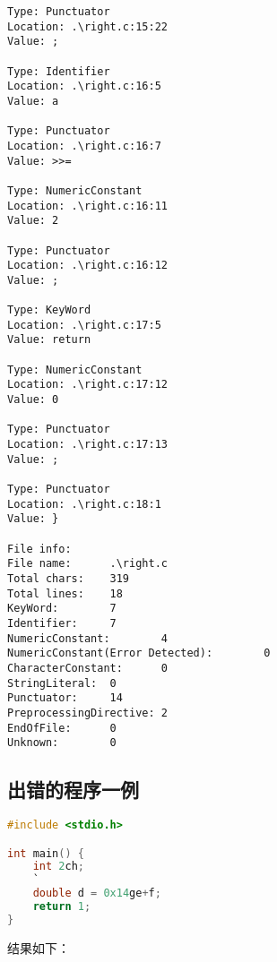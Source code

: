 \documentclass[blue,normal,cn]{elegantnote}
\begin{document}
\begin{lstlisting}
Type: Punctuator
Location: .\right.c:15:22
Value: ;

Type: Identifier
Location: .\right.c:16:5
Value: a

Type: Punctuator
Location: .\right.c:16:7
Value: >>=

Type: NumericConstant
Location: .\right.c:16:11
Value: 2

Type: Punctuator
Location: .\right.c:16:12
Value: ;

Type: KeyWord
Location: .\right.c:17:5
Value: return

Type: NumericConstant
Location: .\right.c:17:12
Value: 0

Type: Punctuator
Location: .\right.c:17:13
Value: ;

Type: Punctuator
Location: .\right.c:18:1
Value: }

File info:
File name:      .\right.c
Total chars:    319
Total lines:    18
KeyWord:        7
Identifier:     7
NumericConstant:        4
NumericConstant(Error Detected):        0
CharacterConstant:      0
StringLiteral:  0
Punctuator:     14
PreprocessingDirective: 2
EndOfFile:      0
Unknown:        0
\end{lstlisting}

\subsection{出错的程序一例}

\begin{lstlisting}[language=C]
#include <stdio.h>

int main() {
    int 2ch;
    `
    double d = 0x14ge+f;
    return 1;
}
\end{lstlisting}

结果如下：
\end{document}
